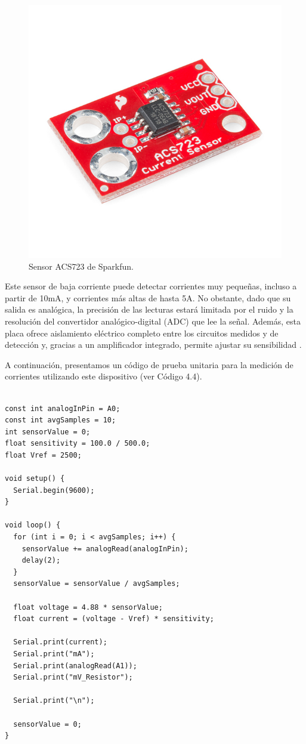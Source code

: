 \begin{figure}[h]
  \centering
  \includegraphics[width=0.7\linewidth]{Pictures/ACS723.jpg} 
  \caption{Sensor ACS723 de Sparkfun.}
  \label{fig:Sensor_ACS723_Imagen}
\end{figure}


Este sensor de baja corriente puede detectar corrientes muy pequeñas, incluso a partir de 10mA, y corrientes más altas de hasta 5A. No obstante, dado que su salida es analógica, la precisión de las lecturas estará limitada por el ruido y la resolución del convertidor analógico-digital (ADC) que lee la señal. Además, esta placa ofrece aislamiento eléctrico completo entre los circuitos medidos y de detección y, gracias a un amplificador integrado, permite ajustar su sensibilidad \cite{sparkfun14544}.

A continuación, presentamos un código de prueba unitaria para la medición de corrientes utilizando este dispositivo (ver Código 4.4).



\begin{lstlisting}[caption={Prueba unitaria para sensor de corriente ACS723}, label={lst:acs723cod}]

const int analogInPin = A0;
const int avgSamples = 10;
int sensorValue = 0;
float sensitivity = 100.0 / 500.0; 
float Vref = 2500;

void setup() {
  Serial.begin(9600);
}

void loop() {
  for (int i = 0; i < avgSamples; i++) {
    sensorValue += analogRead(analogInPin);
    delay(2);
  }
  sensorValue = sensorValue / avgSamples;

  float voltage = 4.88 * sensorValue;
  float current = (voltage - Vref) * sensitivity;

  Serial.print(current);
  Serial.print("mA");
  Serial.print(analogRead(A1));
  Serial.print("mV_Resistor");

  Serial.print("\n");
  
  sensorValue = 0;
}


\end{lstlisting}

